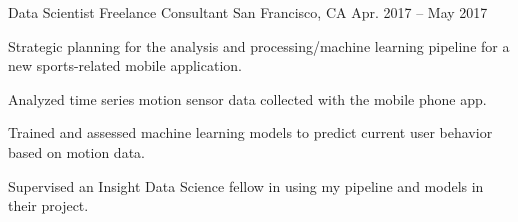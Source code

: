 \begin{cventries}
  \cventry
    {Data Scientist} %
    {Freelance Consultant} %
    {San Francisco, CA} %
    {Apr. 2017 -- May 2017} %
    {
      \begin{cvitems} %
        \item {Strategic planning for the analysis and processing/machine learning pipeline for a new sports-related mobile application.} %
        \item {Analyzed time series motion sensor data collected with the mobile phone app.}
        \item {Trained and assessed machine learning models to predict current user behavior based on motion data.}
        \item {Supervised an Insight Data Science fellow in using my pipeline and models in their project.} %
      \end{cvitems}
    }



\end{cventries}
